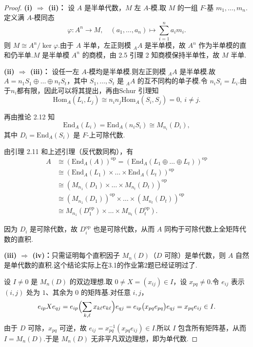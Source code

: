 \documentclass[11pt,a4paper]{article}
\theoremstyle{plain}
\theoremstyle{definition}
\begin{document}
\begin{proof}
\noindent \textbf{(i) $\Rightarrow$ (ii)：} 设 $A$ 是半单代数，$M$ 左 $A$-模.取 $M$ 的一组 $F$-基 $m_1, \dots, m_n$.定义满 $A$-模同态
\[
\varphi: A^n \longrightarrow M, \quad (a_1,\dots,a_n) \mapsto \sum_{i=1}^n a_i m_i.
\]
则 $M \cong A^n / \ker\varphi$.由于 $A$ 半单，左正则模 ${}_A A$ 是半单模，故 $A^n$ 作为半单模的直和仍半单.$M$ 是半单模 $A^n$ 的商模，由 2.5 引理 2 知商模保持半单性，故 $M$ 半单.

\medskip
\noindent \textbf{(ii) $\Rightarrow$ (iii)：} 设任一左 $A$-模均是半单模.则左正则模 ${}_A A$ 是半单模.故 $A = n_1S_1 \oplus \dots \oplus n_tS_t$，其中 $S_1, \dots, S_t$ 是 ${}_A A$ 的互不同构的单子模.令 $n_iS_i = L_i$.由于$n_i$都有限，因此可以将其提出，再由Schur 引理知
$$
\mathrm{Hom}_A(L_i, L_j) \cong n_i n_j \mathrm{Hom}_A(S_i, S_j) = 0, \ i \neq j.
$$

再由推论 2.12 知
$$
\mathrm{End}_A(L_i) = \mathrm{End}_A(n_iS_i) \cong M_{n_i}(D_i),
$$
其中 $D_i = \mathrm{End}_A(S_i)$ 是 $F$-上可除代数.

由引理 2.11 和上述引理（反代数同构），有
$$
\begin{aligned}
A &\cong (\mathrm{End}_A(A))^{\mathrm{op}} = (\mathrm{End}_A(L_1 \oplus \dots \oplus L_t))^{\mathrm{op}} \\
&\cong (\mathrm{End}_A(L_1) \times \dots \times \mathrm{End}_A(L_t))^{\mathrm{op}} \\
&\cong (M_{n_1}(D_1) \times \dots \times M_{n_t}(D_t))^{\mathrm{op}} \\
&\cong (M_{n_1}(D_1))^{\mathrm{op}} \times \dots \times (M_{n_t}(D_t))^{\mathrm{op}} \\
&\cong M_{n_1}(D_1^{\mathrm{op}}) \times \dots \times M_{n_t}(D_t^{\mathrm{op}}).
\end{aligned}
$$

因为 $D_i$ 是可除代数，故 $D_i^{\mathrm{op}}$ 也是可除代数，从而 $A$ 同构于可除代数上全矩阵代数的直积.

\medskip
\noindent \textbf{(iii) $\Rightarrow$ (iv)：}只需证明每个直积因子 $M_{n}(D)$（$D$ 可除）是单代数，则 $A$ 自然是单代数的直积.这个结论实际上在3.1的作业第2题已经证明过了.

设 $I \neq 0$ 是 $M_n(D)$ 的双边理想.取 $0 \neq X = (x_{ij}) \in I$，设 $x_{pq} \neq 0$.令 $e_{ij}$ 表示 $(i,j)$ 处为 $1$、其余为 $0$ 的矩阵基.对任意 $i,j$，
\[
e_{ip} X e_{qj} = e_{ip}\Bigl(\sum_{k,\ell} x_{k\ell} e_{k\ell}\Bigr) e_{qj}
= e_{ip} \bigl(x_{pq} e_{pq}\bigr) e_{qj}
= x_{pq} e_{ij} \in I.
\]
由于 $D$ 可除，$x_{pq}$ 可逆，故 $e_{ij} = x_{pq}^{-1} (x_{pq} e_{ij}) \in I$.所以 $I$ 包含所有矩阵基，从而 $I = M_n(D)$.于是 $M_n(D)$ 无非平凡双边理想，即为单代数.


\end{proof}
\end{document}
